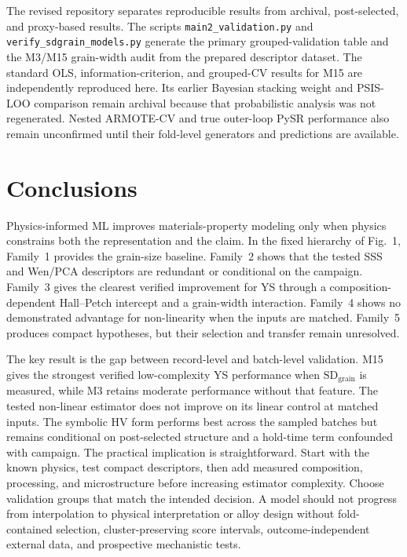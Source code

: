 \documentclass[5p,times,twocolumn]{elsarticle}
\begin{document}
The revised repository separates reproducible results from archival, post-selected, and proxy-based results. The scripts \texttt{main2\_validation.py} and \texttt{verify\_sdgrain\_models.py} generate the primary grouped-validation table and the M3/M15 grain-width audit from the prepared descriptor dataset. The standard OLS, information-criterion, and grouped-CV results for M15 are independently reproduced here. Its earlier Bayesian stacking weight and PSIS-LOO comparison remain archival because that probabilistic analysis was not regenerated. Nested ARMOTE-CV and true outer-loop PySR performance also remain unconfirmed until their fold-level generators and predictions are available.

\section{Conclusions}
\label{sec:conclusions}

Physics-informed ML improves materials-property modeling only when physics constrains both the representation and the claim. In the fixed hierarchy of Fig.~1, Family~1 provides the grain-size baseline. Family~2 shows that the tested SSS and Wen/PCA descriptors are redundant or conditional on the campaign. Family~3 gives the clearest verified improvement for YS through a composition-dependent Hall--Petch intercept and a grain-width interaction. Family~4 shows no demonstrated advantage for non-linearity when the inputs are matched. Family~5 produces compact hypotheses, but their selection and transfer remain unresolved.

The key result is the gap between record-level and batch-level validation. M15 gives the strongest verified low-complexity YS performance when $\mathrm{SD}_{\mathrm{grain}}$ is measured, while M3 retains moderate performance without that feature. The tested non-linear estimator does not improve on its linear control at matched inputs. The symbolic HV form performs best across the sampled batches but remains conditional on post-selected structure and a hold-time term confounded with campaign. The practical implication is straightforward. Start with the known physics, test compact descriptors, then add measured composition, processing, and microstructure before increasing estimator complexity. Choose validation groups that match the intended decision. A model should not progress from interpolation to physical interpretation or alloy design without fold-contained selection, cluster-preserving score intervals, outcome-independent external data, and prospective mechanistic tests.
\end{document}
